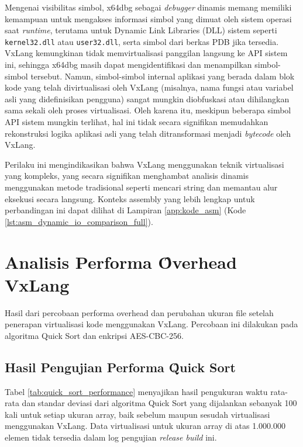 Mengenai visibilitas simbol, x64dbg sebagai \textit{debugger} dinamis memang memiliki kemampuan untuk mengakses informasi simbol yang dimuat oleh sistem operasi saat \textit{runtime}, terutama untuk Dynamic Link Libraries (DLL) sistem seperti \texttt{kernel32.dll} atau \texttt{user32.dll}, serta simbol dari berkas PDB jika tersedia. VxLang kemungkinan tidak memvirtualisasi panggilan langsung ke API sistem ini, sehingga x64dbg masih dapat mengidentifikasi dan menampilkan simbol-simbol tersebut. Namun, simbol-simbol internal aplikasi yang berada dalam blok kode yang telah divirtualisasi oleh VxLang (misalnya, nama fungsi atau variabel asli yang didefinisikan pengguna) sangat mungkin diobfuskasi atau dihilangkan sama sekali oleh proses virtualisasi. Oleh karena itu, meskipun beberapa simbol API sistem mungkin terlihat, hal ini tidak secara signifikan memudahkan rekonstruksi logika aplikasi asli yang telah ditransformasi menjadi \textit{bytecode} oleh VxLang.

Perilaku ini mengindikasikan bahwa VxLang menggunakan teknik virtualisasi yang kompleks, yang secara signifikan menghambat analisis dinamis menggunakan metode tradisional seperti mencari string dan memantau alur eksekusi secara langsung. Konteks assembly yang lebih lengkap untuk perbandingan ini dapat dilihat di Lampiran \ref{app:kode_asm} (Kode \ref{lst:asm_dynamic_io_comparison_full}).

\section{Analisis Performa \f{Overhead} VxLang}
Hasil dari percobaan performa overhead dan perubahan ukuran file setelah penerapan virtualisasi kode menggunakan VxLang. Percobaan ini dilakukan pada algoritma Quick Sort dan enkripsi AES-CBC-256.

\subsection{Hasil Pengujian Performa \f{Quick Sort}}
Tabel \ref{tab:quick_sort_performance} menyajikan hasil pengukuran waktu rata-rata dan standar deviasi dari algoritma Quick Sort yang dijalankan sebanyak 100 kali untuk setiap ukuran array, baik sebelum maupun sesudah virtualisasi menggunakan VxLang. Data virtualisasi untuk ukuran array di atas 1.000.000 elemen tidak tersedia dalam log pengujian \textit{release build} ini.

